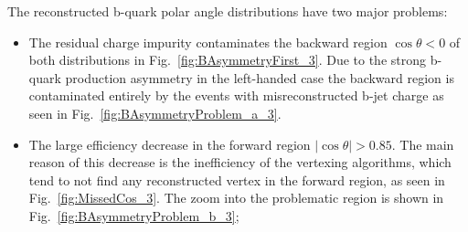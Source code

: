The reconstructed b-quark polar angle distributions have two major problems:
\begin{itemize}
	\item The residual charge impurity contaminates the backward region $\cos\theta < 0$ of both distributions in Fig.~\ref{fig:BAsymmetryFirst_3}. Due to the strong b-quark production asymmetry in the left-handed case the backward region is contaminated entirely by the events with misreconstructed b-jet charge as seen in Fig.~\ref{fig:BAsymmetryProblem_a_3}.
	\item The large efficiency decrease in the forward region $|\cos\theta| > 0.85$. The main reason of this decrease is the inefficiency of the vertexing algorithms, which tend to not find any reconstructed vertex in the forward region, as seen in Fig.~\ref{fig:MissedCos_3}. The zoom into the problematic region is shown in Fig.~\ref{fig:BAsymmetryProblem_b_3};

\end{itemize}


